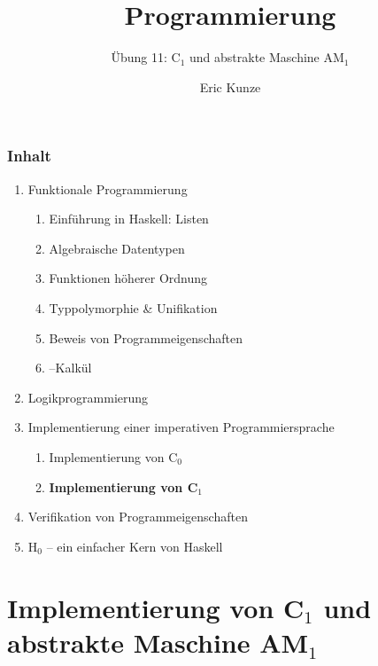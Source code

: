\documentclass{beamer}
\begin{document}
	
	\title{Programmierung}
	\subtitle{Übung 11: C${}_\text{1}$ und abstrakte Maschine AM${}_\text{1}$}
	\author{Eric Kunze}
	\date{}
	
	\maketitle
	


\begin{frame}[fragile] \frametitle{Inhalt}
	\begin{enumerate}
		\item Funktionale Programmierung
		\begin{enumerate}
			\item Einführung in Haskell: Listen
			\item Algebraische Datentypen
			\item Funktionen höherer Ordnung
			\item Typpolymorphie \& Unifikation
			\item Beweis von Programmeigenschaften
			\item \textlambda--Kalkül
		\end{enumerate}
		\item Logikprogrammierung
		\item Implementierung einer imperativen Programmiersprache
		\begin{enumerate}
			\item Implementierung von C${}_\text{0}$
			\item \textbf{Implementierung von C${}_\text{1}$}
		\end{enumerate}
		\item Verifikation von Programmeigenschaften
		\item H${}_\text{0}$ -- ein einfacher Kern von Haskell
	\end{enumerate}
\end{frame}



\section{Implementierung von C${}_\text{1}$ und abstrakte Maschine AM${}_\text{1}$}
\end{document}
